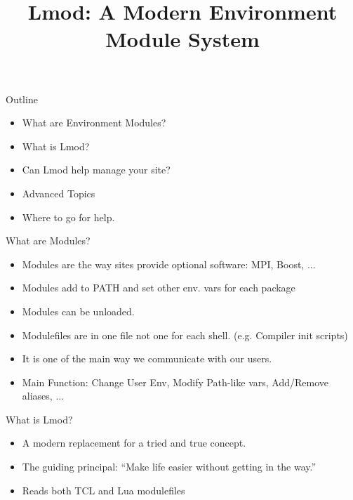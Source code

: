 \documentclass{beamer}
\begin{document}
\title[Lmod]{Lmod: A Modern Environment Module System}

\frame{\titlepage} 

\begin{frame}{Outline}
  \begin{itemize}
    \item What are Environment Modules?
    \item What is Lmod?
    \item Can Lmod help manage your site?
    \item Advanced Topics
    \item Where to go for help.
  \end{itemize}
\end{frame}

\begin{frame}{What are Modules?}
  \begin{itemize}
    \item Modules are the way sites provide optional software: MPI,
      Boost, ...
    \item Modules add to PATH and set other env. vars for each package
    \item Modules can be unloaded.
    \item Modulefiles are in one file not one for each
      shell. (e.g. Compiler init scripts)
    \item It is one of the main way we communicate with our users.
    \item Main Function: Change User Env, Modify Path-like vars, Add/Remove
      aliases, ...
  \end{itemize}
\end{frame}

\begin{frame}{What is Lmod?}
  \begin{itemize}
    \item A modern replacement for a tried and true concept.
    \item The guiding principal: ``Make life easier without getting in
      the way.''
    \item Reads both TCL and Lua modulefiles
  \end{itemize}
\end{frame}
\end{document}
